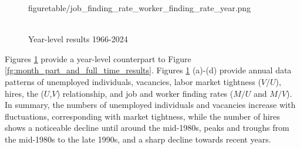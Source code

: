 \documentclass[12pt]{article}
\begin{document}
\begin{figure}[!ht]
\begin{center}
{  {figuretable/job_finding_rate_worker_finding_rate_year.png}}
  \\
  \\
  \caption{Year-level results 1966-2024}
  \label{fg:year_results} 
  \end{center}
  \footnotesize
\end{figure} 

Figures \ref{fg:year_results} provide a year-level counterpart to Figure \ref{fg:month_part_and_full_time_results}. Figures \ref{fg:year_results} (a)-(d) provide annual data patterns of unemployed individuals, vacancies, labor market tightness (\(V/U\)), hires, the  ($U$,$V$) relationship, and job and worker finding rates (\(M/U\) and \(M/V\)). In summary, the numbers of unemployed individuals and vacancies increase with fluctuations, corresponding with market tightness, while the number of hires shows a noticeable decline until around the mid-1980s, peaks and troughs from the mid-1980s to the late 1990s, and a sharp decline towards recent years.
\end{document}
